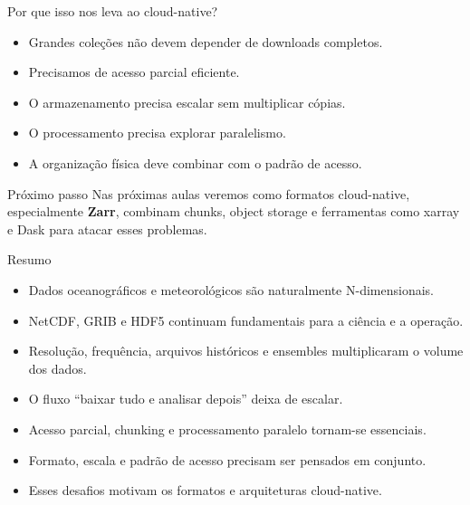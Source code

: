 \documentclass[aspectratio=169]{beamer}
\begin{document}
\begin{frame}{Por que isso nos leva ao cloud-native?}
\begin{itemize}
  \item Grandes coleções não devem depender de downloads completos.
  \item Precisamos de acesso parcial eficiente.
  \item O armazenamento precisa escalar sem multiplicar cópias.
  \item O processamento precisa explorar paralelismo.
  \item A organização física deve combinar com o padrão de acesso.
\end{itemize}

\vspace{0.4cm}

\begin{block}{Próximo passo}
Nas próximas aulas veremos como formatos cloud-native, especialmente \textbf{Zarr}, combinam chunks, object storage e ferramentas como xarray e Dask para atacar esses problemas.
\end{block}
\end{frame}

\begin{frame}{Resumo}
\begin{itemize}
  \item Dados oceanográficos e meteorológicos são naturalmente N-dimensionais.
  \item NetCDF, GRIB e HDF5 continuam fundamentais para a ciência e a operação.
  \item Resolução, frequência, arquivos históricos e ensembles multiplicaram o volume dos dados.
  \item O fluxo ``baixar tudo e analisar depois'' deixa de escalar.
  \item Acesso parcial, chunking e processamento paralelo tornam-se essenciais.
  \item Formato, escala e padrão de acesso precisam ser pensados em conjunto.
  \item Esses desafios motivam os formatos e arquiteturas cloud-native.
\end{itemize}
\end{frame}
\end{document}
